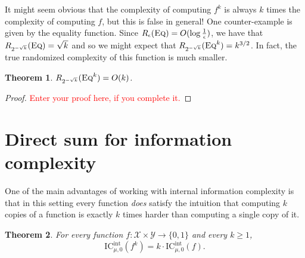 \documentclass[11pt]{amsart}
\theoremstyle{plain}
\newtheorem{theorem}{Theorem}
\theoremstyle{definition}
\theoremstyle{plain}
\newcommand{\calX}{\mathcal{X}}
\newcommand{\calY}{\mathcal{Y}}
\newcommand{\Eq}{\textsc{Eq}}
\newcommand{\ICint}{\mathrm{IC}^{\mathrm{int}}}
\newcommand{\replacethistext}[1]{\textcolor{red}{#1}}
\begin{document}
It might seem obvious that the complexity of computing $f^k$ is always $k$ times the complexity of computing $f$, but this is false in general! One counter-example is given by the equality function. Since $R_\epsilon(\Eq) = O(\log \frac1\epsilon)$, we have that $R_{2^{-\sqrt{k}}}(\Eq) = \sqrt{k}$ and so we might expect that $R_{2^{-\sqrt{k}}}(\Eq^k) = k^{3/2}$. In fact, the true randomized complexity of this function is much smaller.

\begin{theorem}
$R_{2^{-\sqrt{k}}}(\Eq^k) = O(k)$.
\end{theorem}

\begin{proof}
\replacethistext{Enter your proof here, if you complete it.}
\end{proof}


\newpage 
\section{Direct sum for information complexity}

One of the main advantages of working with internal information complexity is that in this setting every function \emph{does} satisfy the intuition that computing $k$ copies of a function is exactly $k$ times harder than computing a single copy of it.
\begin{theorem}\label{th:9}
For every function $f : \calX \times \calY \to \{0,1\}$ and every $k \ge 1$,
\[
\ICint_{\mu,0}(f^k) = k \cdot \ICint_{\mu,0}(f).
\]
\end{theorem}
\end{document}
